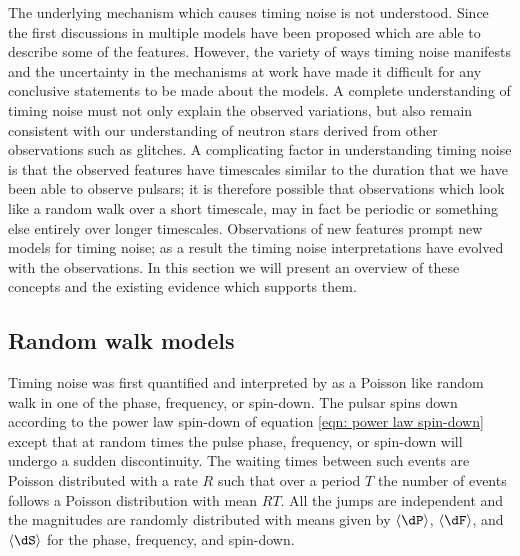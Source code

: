 The underlying mechanism which causes timing noise is not understood. Since the
first discussions in \citet{Boynton1972} multiple models have been proposed
which are able to describe some of the features. However, the variety of ways
timing noise manifests and the uncertainty in the mechanisms at work have made
it difficult for any conclusive statements to be made about the models. A
complete understanding of timing noise must not only explain the observed
variations, but also remain consistent with our understanding of neutron stars
derived from other observations such as glitches. A complicating factor in
understanding timing noise is that the observed features have timescales
similar to the duration that we have been able to observe pulsars; it is
therefore possible that observations which look like a random walk over a short
timescale, may in fact be periodic or something else entirely over longer
timescales.  Observations of new features prompt new models for timing noise;
as a result the timing noise interpretations have evolved with the
observations. In this section we will present an overview of these concepts and
the existing evidence which supports them.

\subsection{Random walk models}
\label{sec: TN interpretations random walk models}

Timing noise was first quantified and interpreted by \citet{Boynton1972} as a
Poisson like random walk in one of the phase, frequency, or spin-down. The
pulsar spins down according to the power law spin-down of equation \eqref{eqn:
power law spin-down} except that at random times the pulse phase, frequency, or
spin-down will undergo a sudden discontinuity. The waiting times between such events
are Poisson distributed with a rate $R$ such that over a period $T$ the number of
events follows a Poisson distribution with mean $RT$. All the jumps are
independent and the magnitudes are randomly distributed with means given by
$\langle\dP\rangle$, $\langle\dF\rangle$, and $\langle\dS\rangle$ for the phase,
frequency, and spin-down.

